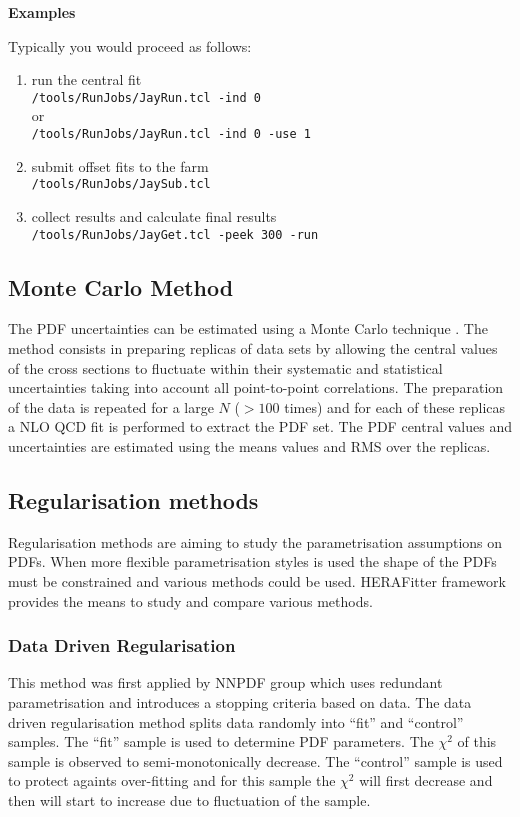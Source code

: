\goodbreak
{\bf {Examples}}

Typically you would proceed as follows:
\begin{enumerate}
\item
run the central fit\\
\HF\verb'/tools/RunJobs/JayRun.tcl -ind 0'\\
or\\
\HF\verb'/tools/RunJobs/JayRun.tcl -ind 0 -use 1'
\item
submit offset fits to the farm\\
\HF\verb'/tools/RunJobs/JaySub.tcl'
\item
collect results and calculate final results\\
\HF\verb'/tools/RunJobs/JayGet.tcl -peek 300 -run'
\end{enumerate}



\subsection{Monte Carlo Method}
\label{sec:ToyMC}

The PDF uncertainties can be estimated using a Monte Carlo technique \cite{mcmethod}.
The method consists in preparing replicas of data sets by allowing the central values of the cross sections to 
fluctuate within their systematic and statistical uncertainties taking into account all point-to-point correlations.
The preparation of the data is repeated for a large $N$ ($>100$ times) and for each of these replicas a NLO QCD fit is performed to 
extract the PDF set. The PDF central values and uncertainties are estimated using the means values and RMS 
over the replicas. 



\subsection{Regularisation methods}

Regularisation methods are aiming to study the parametrisation assumptions on PDFs. When more flexible parametrisation styles is used the shape of the PDFs must be constrained and various methods could be used.
HERAFitter framework provides the means to study and compare various methods.

\subsubsection{Data Driven Regularisation}
This method was first applied by NNPDF group which uses redundant parametrisation and introduces a stopping criteria based on data.
The data driven regularisation method splits data randomly into ``fit'' and ``control''  samples. The ``fit'' sample is used to determine PDF parameters. The $\chi^2$ of this sample is observed to semi-monotonically decrease. The ``control'' sample is used to protect againts over-fitting and for this sample the $\chi^2$ will first decrease and then will start to increase due to fluctuation of the sample.


